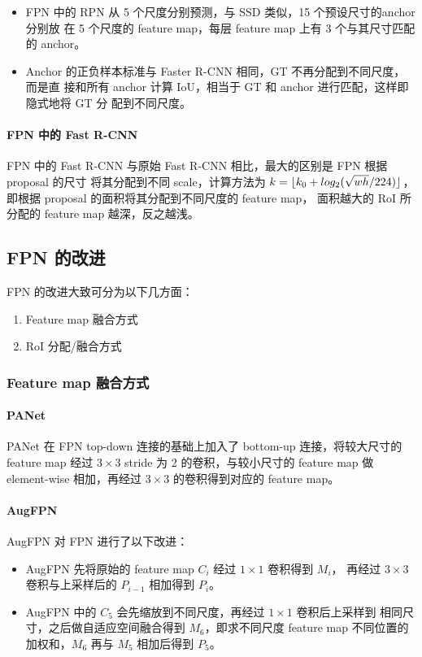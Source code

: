 \begin{itemize}
  \item FPN 中的 RPN 从 5 个尺度分别预测，与 SSD 类似，15 个预设尺寸的anchor 分别放
    在 5 个尺度的 feature map，每层 feature map 上有 3 个与其尺寸匹配的 anchor。
  \item Anchor 的正负样本标准与 Faster R-CNN 相同，GT 不再分配到不同尺度，而是直
    接和所有 anchor 计算 IoU，相当于 GT 和 anchor 进行匹配，这样即隐式地将 GT 分
    配到不同尺度。
\end{itemize}

\paragraph{FPN 中的 Fast R-CNN}

FPN 中的 Fast R-CNN 与原始 Fast R-CNN 相比，最大的区别是 FPN 根据 proposal 的尺寸
将其分配到不同 scale，计算方法为 $ k = \lfloor k_0 + \\log_2 (
\sqrt{wh}/224 ) \rfloor$，即根据 proposal 的面积将其分配到不同尺度的 feature map，
面积越大的 RoI 所分配的 feature map 越深，反之越浅。

\subsection{FPN 的改进}
FPN 的改进大致可分为以下几方面：
\begin{enumerate}
  \item Feature map 融合方式
  \item RoI 分配/融合方式
\end{enumerate}

\subsubsection{Feature map 融合方式}
\paragraph{PANet}
PANet 在 FPN top-down 连接的基础上加入了 bottom-up 连接，将较大尺寸的 feature
map 经过 $3 \times 3$ stride 为 2 的卷积，与较小尺寸的 feature
map 做 element-wise 相加，再经过 $3 \times 3$ 的卷积得到对应的 feature
map\cite{2018-PANet}。

\paragraph{AugFPN}
AugFPN 对 FPN 进行了以下改进：
\begin{itemize}
  \item AugFPN 先将原始的 feature map $C_i$ 经过 $1 \times 1$ 卷积得到 $M_i$，
    再经过 $3 \times 3$ 卷积与上采样后的 $P_{i-1}$ 相加得到 $P_i$。
  \item AugFPN 中的 $C_5$ 会先缩放到不同尺度，再经过 $1 \times 1$ 卷积后上采样到
    相同尺寸，之后做自适应空间融合得到 $M_6$，即求不同尺度 feature map 不同位置的
    加权和，$M_6$ 再与 $M_5$ 相加后得到 $P_5$。
\end{itemize}

